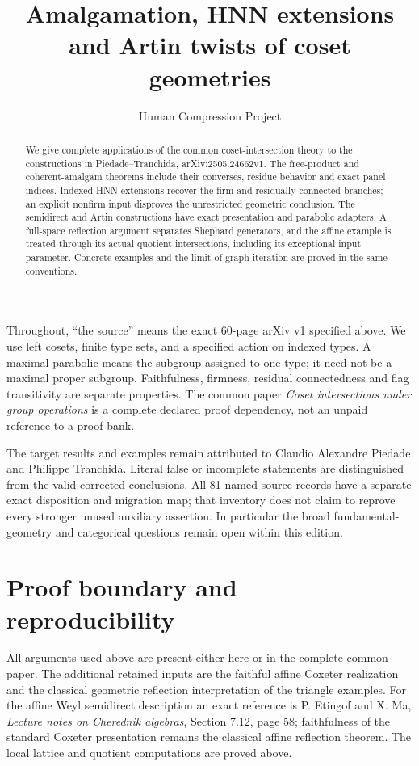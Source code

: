 
\title{Amalgamation, HNN extensions and Artin twists of coset geometries}
\author{Human Compression Project}\date{}
\maketitle
\begin{abstract}
We give complete applications of the common coset-intersection theory to the constructions in Piedade--Tranchida, arXiv:2505.24662v1. The free-product and coherent-amalgam theorems include their converses, residue behavior and exact panel indices. Indexed HNN extensions recover the firm and residually connected branches; an explicit nonfirm input disproves the unrestricted geometric conclusion. The semidirect and Artin constructions have exact presentation and parabolic adapters. A full-space reflection argument separates Shephard generators, and the affine example is treated through its actual quotient intersections, including its exceptional input parameter. Concrete examples and the limit of graph iteration are proved in the same conventions.
\end{abstract}
Throughout, ``the source'' means the exact 60-page arXiv v1 specified above. We use left cosets, finite type sets, and a specified action on indexed types. A maximal parabolic means the subgroup assigned to one type; it need not be a maximal proper subgroup. Faithfulness, firmness, residual connectedness and flag transitivity are separate properties. The common paper \emph{Coset intersections under group operations} is a complete declared proof dependency, not an unpaid reference to a proof bank.

The target results and examples remain attributed to Claudio Alexandre Piedade and Philippe Tranchida. Literal false or incomplete statements are distinguished from the valid corrected conclusions. All 81 named source records have a separate exact disposition and migration map; that inventory does not claim to reprove every stronger unused auxiliary assertion. In particular the broad fundamental-geometry and categorical questions remain open within this edition.






\section{Proof boundary and reproducibility}
All arguments used above are present either here or in the complete common paper. The additional retained inputs are the faithful affine Coxeter realization and the classical geometric reflection interpretation of the triangle examples. For the affine Weyl semidirect description an exact reference is P. Etingof and X. Ma, \emph{Lecture notes on Cherednik algebras}, Section 7.12, page 58; faithfulness of the standard Coxeter presentation remains the classical affine reflection theorem. The local lattice and quotient computations are proved above.

